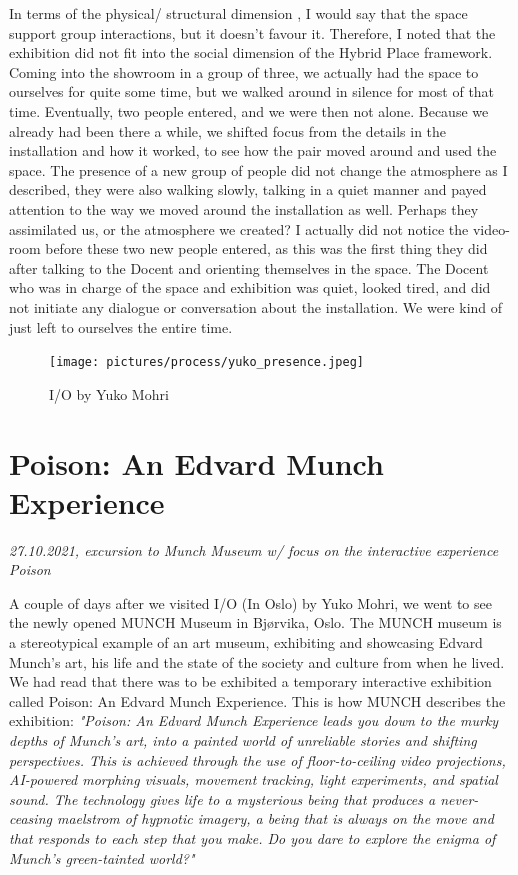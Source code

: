 In terms of the physical/ structural dimension \autocite{hybridplace_ciolfi}, I would say that the space support group interactions, but it doesn't favour it. Therefore, I noted that the exhibition did not fit into the social dimension of the Hybrid Place framework. Coming into the showroom in a group of three, we actually had the space to ourselves for quite some time, but we walked around in silence for most of that time. Eventually, two people entered, and we were then not alone. Because we already had been there a while, we shifted focus from the details in the installation and how it worked, to see how the pair moved around and used the space. The presence of a new group of people did not change the atmosphere as I described, they were also walking slowly, talking in a quiet manner and payed attention to the way we moved around the installation as well. Perhaps they assimilated us, or the atmosphere we created? I actually did not notice the video-room before these two new people entered, as this was the first thing they did after talking to the Docent and orienting themselves in the space. The Docent who was in charge of the space and exhibition was quiet, looked tired, and did not initiate any dialogue or conversation about the installation. We were kind of just left to ourselves the entire time.


\begin{figure}[H]
\centering
\texttt{[image: pictures/process/yuko\_presence.jpeg]}
\caption{I/O by Yuko Mohri}
\end{figure}

\section{Poison: An Edvard Munch Experience}
\par
\emph{27.10.2021, excursion to Munch Museum w/ focus on the interactive experience Poison}
\par

A couple of days after we visited I/O (In Oslo) by Yuko Mohri, we went to see the newly opened MUNCH Museum in Bjørvika, Oslo. The MUNCH museum is a stereotypical example of an art museum, exhibiting and showcasing Edvard Munch's art, his life and the state of the society and culture from when he lived. We had read that there was to be exhibited a temporary interactive exhibition called Poison: An Edvard Munch Experience. This is how MUNCH describes the exhibition: \emph{"Poison: An Edvard Munch Experience leads you down to the murky depths of Munch’s art, into a painted world of unreliable stories and shifting perspectives. This is achieved through the use of floor-to-ceiling video projections, AI-powered morphing visuals, movement tracking, light experiments, and spatial sound. The technology gives life to a mysterious being that produces a never-ceasing maelstrom of hypnotic imagery, a being that is always on the move and that responds to each step that you make. Do you dare to explore the enigma of Munch’s green-tainted world?"}\autocite{munch_poison_web}

